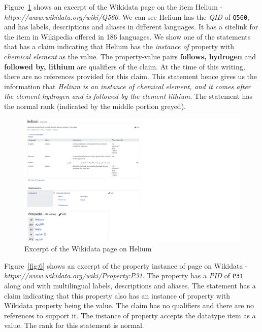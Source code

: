 Figure~\ref{fig:5} shows an excerpt of the Wikidata page on the item Helium - \textit{https://www.wikidata.org/wiki/Q560}. We can see Helium has the \textit{QID} of \texttt{Q560}, and has labels, descriptions and aliases in different languages. It has a sitelink for the item in Wikipedia offered in 186 languages. We show one of the statements that has a claim indicating that Helium has the \textit{instance of} property with c\textit{hemical element} as the value. The property-value pairs \textbf{follows, hydrogen} and \textbf{followed by, lithium} are qualifiers of the claim. At the time of this writing, there are no references provided for this claim. This statement hence gives us the information that \textit{Helium is an instance of chemical element, and it comes after the element hydrogen and is followed by the element lithium}. The statement has  the normal rank (indicated by the middle portion greyed). 

\begin{figure}[h]
  \centering
  \includegraphics[width=0.75 \linewidth]{images/helium.pdf}
  \caption{Excerpt of the Wikidata page on Helium}
  \label{fig:5}
\end{figure}

Figure~\ref{fig:6} shows an excerpt of the property instance of page on Wikidata - \textit{https://www.wikidata.org/wiki/Property:P31}. The property has a \textit{PID} of \texttt{P31} along and with multilingual labels, descriptions and aliases. The statement has a claim indicating that this property also has an instance of property with Wikidata property being the value. The claim has no qualifiers and there are no references to support it. The instance of property accepts the datatype item as a value. The rank for this statement is normal.


